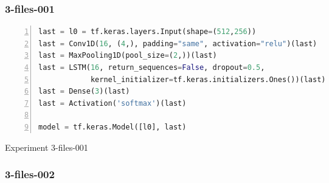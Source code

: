 \subsubsection{3-files-001}

\noindent
\begin{algorithm}
\begin{lstlisting}[language=Python, frame=single, numbers=left]
last = l0 = tf.keras.layers.Input(shape=(512,256))
last = Conv1D(16, (4,), padding="same", activation="relu")(last)
last = MaxPooling1D(pool_size=(2,))(last)
last = LSTM(16, return_sequences=False, dropout=0.5,
            kernel_initializer=tf.keras.initializers.Ones())(last)
last = Dense(3)(last)
last = Activation('softmax')(last)

model = tf.keras.Model([l0], last)
\end{lstlisting}
\caption{\label{alg:3-files-001}Experiment 3-files-001}
\end{algorithm}

\subsubsection{3-files-002}


